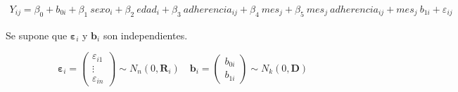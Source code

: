 \documentclass[spanish]{article}
\numberwithin{figure}{subsection}
\numberwithin{equation}{subsection}
\numberwithin{table}{subsection}
\begin{document}









\begin{multline}
	\label{modelo_1}
	Y_{ij} = \beta_0 + b_{0i} + \beta_1\ sexo_i + \beta_2\ edad_i + \beta_3\ adherencia_{ij}
	+ \beta_4\ mes_j + \beta_5\ mes_j\ adherencia_{ij} + mes_j\ b_{1i} + \varepsilon_{ij}
\end{multline}

Se supone que $\bm{\varepsilon}_i$ y $\bm{b}_i$ son independientes.

\[ 
	\bm{\varepsilon}_i = \begin{pmatrix} \varepsilon_{i1} \\ \vdots \\ \varepsilon_{in} \end{pmatrix} \sim N_{n}(0, \bm{R}_i)
	\quad
	\bm{b}_i = \begin{pmatrix} b_{0i} \\ b_{1i} \end{pmatrix} \sim N_k(0, \bm{D})
\]
\end{document}
